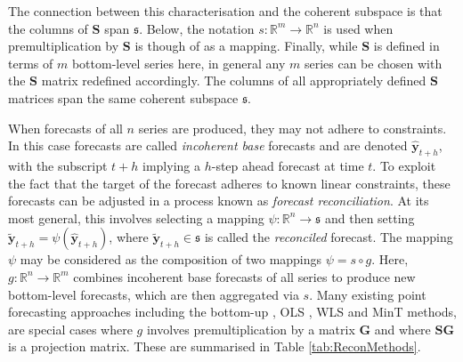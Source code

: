 \documentclass[12pt]{article}
\theoremstyle{definition}
\begin{document}
The connection between this characterisation and the coherent subspace is that the columns of $\bm{S}$ span $\mathfrak{s}$.  Below, the notation $s:\mathbb{R}^m\rightarrow\mathbb{R}^n$ is used when premultiplication by $\bm{S}$ is though of as a mapping.  Finally, while $\bm{S}$ is defined in terms of $m$ bottom-level series here, in general any $m$ series can be chosen with the $\bm{S}$ matrix redefined accordingly.  The columns of all appropriately defined $\bm{S}$ matrices span the same coherent subspace $\mathfrak{s}$.

When forecasts of all $n$ series are produced, they may not adhere to constraints.  In this case forecasts are called {\em incoherent base} forecasts and are denoted $\hat{\bm y}_{t+h}$, with the subscript $t+h$ implying a $h$-step ahead forecast at time $t$.  To exploit the fact that the target of the forecast adheres to known linear constraints, these forecasts can be adjusted in a process known as {\em forecast reconciliation}.  At its most general, this involves selecting a mapping $\psi:\mathbb{R}^n\rightarrow\mathfrak{s}$ and then setting $\tilde{\bm y}_{t+h}=\psi(\hat{\bm y}_{t+h})$, where $\tilde{\bm y}_{t+h}\in\mathfrak{s}$ is called the {\em reconciled} forecast.  The mapping $\psi$ may be considered as the composition of two mappings $\psi=s\circ g$. Here, $g:\mathbb{R}^{n}\rightarrow\mathbb{R}^{m}$ combines incoherent base forecasts of all series to produce new bottom-level forecasts, which are then aggregated via $s$.  Many existing point forecasting approaches including the bottom-up \citep{Dunn1976}, OLS \citep{HynEtAl2011}, WLS \citep[][]{Hyndman2016,AthEtAl2017} and MinT \citep{WicEtAl2019} methods, are special cases where $g$ involves premultiplication by a matrix $\bm{G}$ and where $\bm{S}\bm{G}$ is a projection matrix. These are summarised in Table \ref{tab:ReconMethods}.
\end{document}
